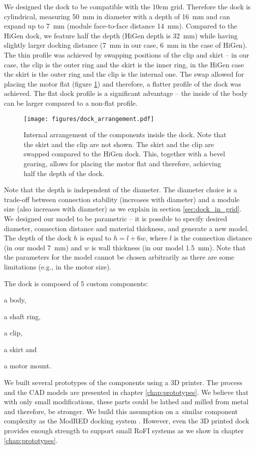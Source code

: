 We designed the dock to be compatible with the 10cm grid. Therefore the dock is
cylindrical, measuring 50~mm in diameter with a depth of 16~mm and can expand up
to 7~mm (module face-to-face distance 14~mm). Compared to the HiGen dock, we
feature half the depth (HiGen depth is 32~mm) while having slightly larger
docking distance (7~mm in our case, 6~mm in the case of HiGen). The thin profile
was achieved by swapping positions of the clip and skirt -- in our case, the
clip is the outer ring and the skirt is the inner ring, in the HiGen case the
skirt is the outer ring and the clip is the internal one. The swap allowed for
placing the motor flat (figure \ref{fig:dock_internal_arrangement}) and
therefore, a flatter profile of the dock was achieved. The flat dock profile is
a significant advantage -- the inside of the body can be larger compared to a
non-flat profile.

\begin{figure}[!ht]
    \centering
    \texttt{[image: figures/dock\_arrangement.pdf]}
    \caption{Internal arrangement of the components inside the dock. Note that
    the skirt and the clip are not shown. The skirt and the clip are swapped
    compared to the HiGen dock. This, together with a bevel gearing, allows for
    placing the motor flat and therefore, achieving half the depth of the dock.}
    \label{fig:dock_internal_arrangement}
\end{figure}

Note that the depth is independent of the diameter. The diameter choice is a
trade-off between connection stability (increases with diameter) and a module
size (also increases with diameter) as we explain in section
\ref{sec:dock_in_grid}. We designed our model to be parametric -- it is possible
to specify desired diameter, connection distance and material thickness, and
generate a new model. The depth of the dock $h$ is equal to $h=l+6w$, where $l$
is the connection distance (in our model 7~mm) and $w$ is wall thickness (in our
model 1.5~mm). Note that the parameters for the model cannot be chosen
arbitrarily as there are some limitations (e.g., in the motor size).

The dock is composed of 5 custom components:
\begin{enumerate*}
    \item a body,
    \item a shaft ring,
    \item a clip,
    \item a skirt and
    \item a motor mount.
\end{enumerate*}
We built several prototypes of the components using a 3D printer. The process
and the CAD models are presented in chapter \ref{chap:prototypes}. We believe
that with only small modifications, these parts could be lathed and milled from
metal and therefore, be stronger. We build this assumption on a~similar
component complexity as the ModRED docking system \cite{hossain_towards_2014}.
However, even the 3D printed dock provides enough strength to support small RoFI
systems as we show in chapter \ref{chap:prototypes}.

